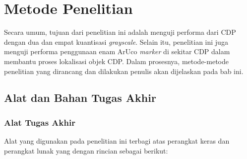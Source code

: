 \chapter{Metode Penelitian}
Secara umum, tujuan dari penelitian ini adalah menguji performa dari CDP dengan dua dan empat kuantisasi \emph{grayscale}. Selain itu, penelitian ini juga menguji performa penggunaan enam ArUco \emph{marker} di sekitar CDP dalam membantu proses lokalisasi objek CDP. Dalam prosesnya, metode-metode penelitian yang dirancang dan dilakukan penulis akan dijelaskan pada bab ini.

\section{Alat dan Bahan Tugas Akhir}

\subsection{Alat Tugas Akhir}

Alat yang digunakan pada penelitian ini terbagi atas perangkat keras dan perangkat lunak yang dengan rincian sebagai berikut:

